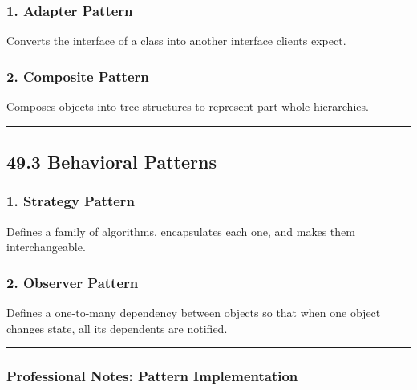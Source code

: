 \hypertarget{adapter-pattern}{%
\subsubsection{1. Adapter Pattern}\label{adapter-pattern}}

Converts the interface of a class into another interface clients expect.

\hypertarget{composite-pattern}{%
\subsubsection{2. Composite Pattern}\label{composite-pattern}}

Composes objects into tree structures to represent part-whole
hierarchies.

\begin{center}\rule{0.5\linewidth}{0.5pt}\end{center}

\hypertarget{behavioral-patterns}{%
\subsection{49.3 Behavioral Patterns}\label{behavioral-patterns}}

\hypertarget{strategy-pattern}{%
\subsubsection{1. Strategy Pattern}\label{strategy-pattern}}

Defines a family of algorithms, encapsulates each one, and makes them
interchangeable.

\hypertarget{observer-pattern}{%
\subsubsection{2. Observer Pattern}\label{observer-pattern}}

Defines a one-to-many dependency between objects so that when one object
changes state, all its dependents are notified.

\begin{center}\rule{0.5\linewidth}{0.5pt}\end{center}

\hypertarget{professional-notes-pattern-implementation}{%
\subsubsection{Professional Notes: Pattern
Implementation}\label{professional-notes-pattern-implementation}}


